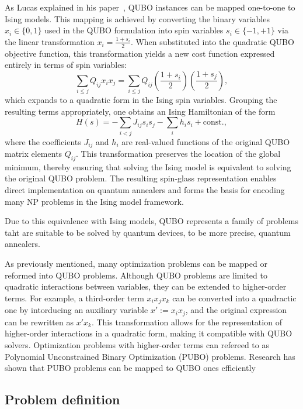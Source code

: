 \documentclass[%
 reprint,
 amsmath,amssymb,
 aps,
]{revtex4-2}
\begin{document}
As Lucas explained in his paper~\cite{Lucas_2014}, QUBO instances can be mapped one-to-one to Ising models. This mapping is achieved by converting the binary variables $x_i \in \{0,1\}$ used in the QUBO formulation into spin variables $s_i \in \{-1, +1\}$ via the linear transformation $x_i = \frac{1 + s_i}{2}$. When substituted into the quadratic QUBO objective function, this transformation yields a new cost function expressed entirely in terms of spin variables:
\[
\sum_{i \le j} Q_{ij} x_i x_j = \sum_{i \le j} Q_{ij} \left( \frac{1 + s_i}{2} \right) \left( \frac{1 + s_j}{2} \right),
\]
which expands to a quadratic form in the Ising spin variables. Grouping the resulting terms appropriately, one obtains an Ising Hamiltonian of the form
\[
H(s) = -\sum_{i < j} J_{ij} s_i s_j - \sum_i h_i s_i + \mathrm{const.},
\]
where the coefficients $J_{ij}$ and $h_i$ are real-valued functions of the original QUBO matrix elements $Q_{ij}$. This transformation preserves the location of the global minimum, thereby ensuring that solving the Ising model is equivalent to solving the original QUBO problem. The resulting spin-glass representation enables direct implementation on quantum annealers and forms the basis for encoding many NP problems in the Ising model framework.

Due to this equivalence with Ising models, QUBO represents a family of problems taht are suitable to be solved by quantum devices, to be more precise, quantum annealers.

As previously mentioned, many optimization problems can be mapped or reformed into QUBO problems. Although QUBO problems are limited to quadratic interactions between variables, they can be extended to higher-order terms. For example, a third-order term $x_i x_j x_k$ can be converted into a quadractic one by intorducing an auxiliary variable $x' := x_i x_j$, and the original expression can be rewritten as $x' x_k$. This transformation allows for the representation of higher-order interactions in a quadratic form, making it compatible with QUBO solvers. Optimization problems with higher-order terms can refereed to as Polynomial Unconstrained Binary Optimization (PUBO) problems. Research has shown that PUBO problems can be mapped to QUBO ones efficiently\cite{Babbush_2013}



\subsection{Problem definition}
\label{subsec:problem}
\end{document}
